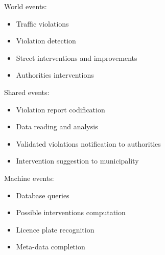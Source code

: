 World events:
\begin{itemize}
    \item Traffic violations
    \item Violation detection
    \item Street interventions and improvements
    \item Authorities interventions
\end{itemize}

Shared events:
\begin{itemize}
    \item Violation report codification
    \item Data reading and analysis
    \item Validated violations notification to authorities
    \item Intervention suggestion to municipality
\end{itemize}

Machine events:
\begin{itemize}
    \item Database queries
    \item Possible interventions computation
    \item Licence plate recognition
    \item Meta-data completion
\end{itemize}

